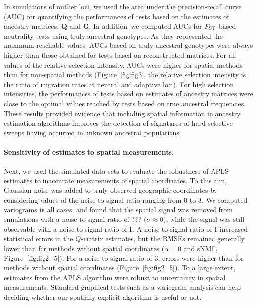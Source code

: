 In simulations of outlier loci, we used the area under the precision-recall
curve (AUC) for quantifying the performances of tests based on the estimates of
ancestry matrices, {\bf Q} and {\bf G}. In addition, we computed AUCs for
$F_{\rm ST}$-based neutrality tests using truly ancestral genotypes. As they
represented the maximum reachable values, AUCs based on truly ancestral
genotypes were always higher than those obtained for tests based on
reconstructed matrices. For all values of the relative selection intensity, AUCs
were higher for spatial methods than for non-spatial methods (Figure~\ref{fig:fig3}, the
relative selection intensity is the ratio of migration rates at neutral and
adaptive loci). For high selection intensities, the performances of tests based
on estimates of ancestry matrices were close to the optimal values reached by
tests based on true ancestral frequencies. These results provided evidence that
including spatial information in ancestry estimation algorithms improves the
detection of signatures of hard selective sweeps having occurred in unknown
ancestral populations.

\paragraph{Sensitivity of estimates to spatial measurements.} Next, we used the
simulated data sets to evaluate the robustness of APLS estimates to inaccurate
measurements of spatial coordinates. To this aim, Gaussian noise was added to
truly observed geographic coordinates by considering values of the
noise-to-signal ratio ranging from 0 to 3. We computed variograms in all
cases, and found that the spatial signal was removed from simulations with a
noise-to-signal ratio of ??? ($\sigma \approx 0$), while the signal was still
observable with a noise-to-signal ratio of 1.
A noise-to-signal ratio of 1 increased statistical errors in the $Q$-matrix
estimates, but the RMSEs remained generally lower than for methods without
spatial coordinates ($\alpha = 0$ and sNMF, Figure~\ref{fig:fig2_5}). For a noise-to-signal ratio
of 3, errors were higher than for methods without spatial coordinates
(Figure~\ref{fig:fig2_5}). To a large extent, estimates from the APLS algorithm
were robust to uncertainty in spatial measurements. Standard graphical tests
such as a variogram analysis can help deciding whether our spatially explicit
algorithm is useful or not.


